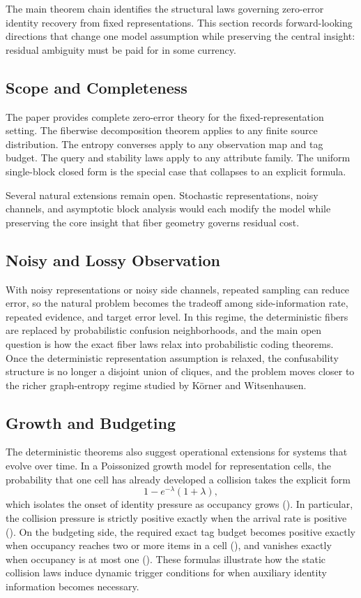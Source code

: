 The main theorem chain identifies the structural laws governing zero-error identity recovery from fixed representations. This section records forward-looking directions that change one model assumption while preserving the central insight: residual ambiguity must be paid for in some currency.

\subsection{Scope and Completeness}

The paper provides complete zero-error theory for the fixed-representation setting. The fiberwise decomposition theorem applies to any finite source distribution. The entropy converses apply to any observation map and tag budget. The query and stability laws apply to any attribute family. The uniform single-block closed form is the special case that collapses to an explicit formula.

Several natural extensions remain open. Stochastic representations, noisy channels, and asymptotic block analysis would each modify the model while preserving the core insight that fiber geometry governs residual cost.

\subsection{Noisy and Lossy Observation}

With noisy representations or noisy side channels, repeated sampling can reduce error, so the natural problem becomes the tradeoff among side-information rate, repeated evidence, and target error level. In this regime, the deterministic fibers are replaced by probabilistic confusion neighborhoods, and the main open question is how the exact fiber laws relax into probabilistic coding theorems. Once the deterministic representation assumption is relaxed, the confusability structure is no longer a disjoint union of cliques, and the problem moves closer to the richer graph-entropy regime studied by K\"orner and Witsenhausen.

\subsection{Growth and Budgeting}

The deterministic theorems also suggest operational extensions for systems that evolve over time. In a Poissonized growth model for representation cells, the probability that one cell has already developed a collision takes the explicit form
\[
1 - e^{-\lambda}(1+\lambda),
\]
which isolates the onset of identity pressure as occupancy grows (). In particular, the collision pressure is strictly positive exactly when the arrival rate is positive (). On the budgeting side, the required exact tag budget becomes positive exactly when occupancy reaches two or more items in a cell (), and vanishes exactly when occupancy is at most one (). These formulas illustrate how the static collision laws induce dynamic trigger conditions for when auxiliary identity information becomes necessary.

